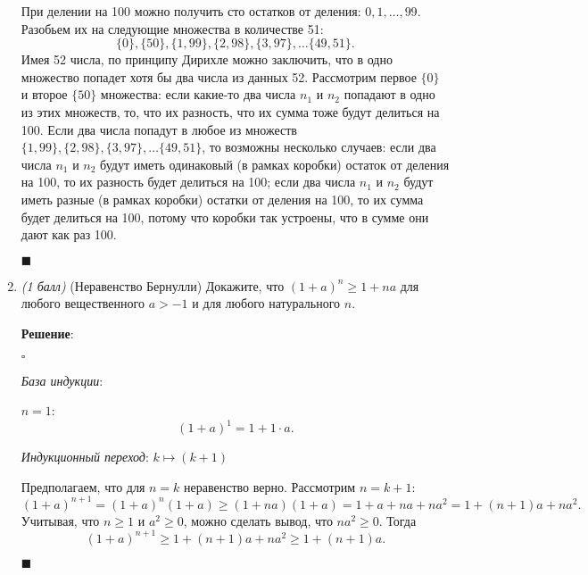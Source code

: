 \documentclass{article}
\begin{document}
\begin{enumerate}
        При делении на 100 можно получить сто остатков от деления: $0, 1, \ldots, 99$. Разобьем их на следующие множества в количестве 51:
        $$\{0\}, \{50\}, \{1, 99\}, \{2, 98\}, \{3, 97\}, \ldots \{49, 51\}.$$
        Имея 52 числа, по принципу Дирихле можно заключить, что в одно множество попадет хотя бы два числа из данных 52. Рассмотрим первое $\{0\}$ и второе $\{50\}$ множества: если какие-то два числа $n_1$ и $n_2$ попадают в одно из этих множеств, то, что их разность, что их сумма тоже будут делиться на 100. Если два числа попадут в любое из множеств $\{1, 99\}, \{2, 98\}, \{3, 97\}, \ldots \{49, 51\}$, то возможны несколько случаев: если два числа $n_1$ и $n_2$ будут иметь одинаковый (в рамках коробки) остаток от деления на 100, то их разность будет делиться на 100; если два числа $n_1$ и $n_2$ будут иметь разные (в рамках коробки) остатки от деления на 100, то их сумма будет делиться на 100, потому что коробки так устроены, что в сумме они дают как раз 100.
        \begin{flushright}
            $\blacksquare$
        \end{flushright}

        \item \textit{(1 балл)} (Неравенство Бернулли) Докажите, что $(1+a)^n\geq1+na$ для любого вещественного $a>-1$ и для любого натурального $n$.
        
        \textbf{Решение}:

        $\square$

        \textit{База индукции}:
        
        $n=1$: 
        \begin{equation}
            (1+a)^1=1+1\cdot a.
        \end{equation}

        \textit{Индукционный переход}: $k\mapsto(k+1)$

        Предполагаем, что для $n=k$ неравенство верно. Рассмотрим $n=k+1$:
        \begin{equation}
            (1+a)^{n+1}=(1+a)^n(1+a)\geq(1+na)(1+a)=1+a+na+na^2=1+(n+1)a+na^2.
        \end{equation}
        Учитывая, что $n\geq1$ и $a^2\geq0$, можно сделать вывод, что $na^2\geq0$. Тогда
        \begin{equation}
            (1+a)^{n+1}\geq1+(n+1)a+na^2\geq1+(n+1)a.
        \end{equation}

        \begin{flushright}
            $\blacksquare$
        \end{flushright}


\end{enumerate}
\end{document}
